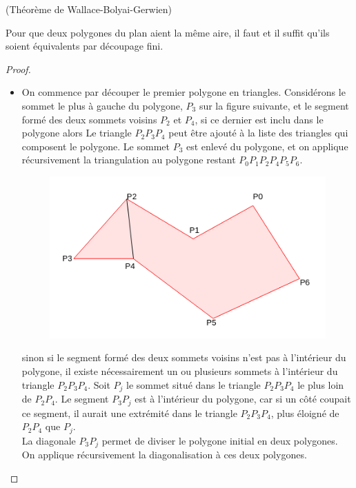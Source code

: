 \begin{kkk}(Théorème de Wallace-Bolyai-Gerwien)\label{wbg}
  \hfill

\noindent
Pour que deux polygones du plan aient la même aire, il faut et il suffit qu'ils soient équivalents par découpage fini.
\end{kkk}
\begin{proof}
  \hfill
  \begin{itemize}
    \item On commence par découper le premier polygone en triangles. Considérons le sommet le plus à gauche du polygone, $P_3$ sur la figure suivante, et le segment formé des deux sommets voisins $P_2$ et $P_4$, si ce dernier est inclu dans le polygone alors Le triangle $P_2P_3P_4$ peut être ajouté à la liste des triangles qui composent le polygone. Le sommet $P_3$ est enlevé du polygone, et on applique récursivement la triangulation au polygone restant $P_0P_1P_2P_4P_5P_6$.
    \begin{figure}[h]
        \centering
        \includegraphics[scale=0.6]{images/x5.png}

    \end{figure}

    sinon si le segment formé des deux sommets voisins n'est pas à l'intérieur du polygone, il existe nécessairement un ou plusieurs sommets à
l'intérieur du triangle $P_2P_3P_4$. Soit $P_j$ le sommet situé dans le triangle $P_2P_3P_4$ le plus loin de $P_2P_4$. Le segment $P_3P_j$ est à l'intérieur du polygone, car si un côté coupait ce segment, il aurait une extrémité dans le triangle $P_2P_3P_4$, plus éloigné de $P_2P_4$ que $P_j$.\\ La diagonale $P_3P_j$ permet de diviser le polygone initial en deux polygones. On applique récursivement la diagonalisation à ces deux polygones.


\end{itemize}
\end{proof}
